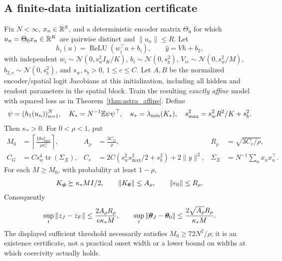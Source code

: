 \subsection{A finite-data initialization certificate}
\begin{corollary}
\label{cor:astra_init}
Fix $N<\infty$, $x_n\in\mathbb{R}^S$, and a deterministic encoder matrix
$\Theta_0$ for which $u_n=\Theta_0x_n\in\mathbb{R}^K$ are pairwise distinct
and $\|u_n\|\le R$. Let
\[
 h_i(u)=\operatorname{ReLU}(w_i^\top u+b_i),\qquad \hat y=Vh+b_2,
\]
with independent $w_i\sim\mathcal N(0,s_w^2I_K/K)$,
$b_i\sim\mathcal N(0,s_b^2)$, $V_{ci}\sim\mathcal N(0,s_w^2/M)$,
$b_{2,c}\sim\mathcal N(0,s_b^2)$, and $s_w,s_b>0$, $1\le c\le C$.
Let $A,B$ be the normalized encoder/spatial logit Jacobians at this
initialization, including all hidden and readout parameters in the
spatial block. Train the resulting \emph{exactly affine} model with
squared loss as in Theorem~\ref{thm:astra_affine}.
Define
\[
 \psi=(h_1(u_n))_{n=1}^N,\quad K_*=N^{-1}\mathbb{E}\psi\psi^\top,
 \quad\kappa_*=\lambda_{\min}(K_*),\quad
 s_{\max}^2=s_w^2R^2/K+s_b^2.
\]
Then $\kappa_*>0$. For $0<\rho<1$, put
\begin{align*}
 M_0&=\left\lceil\frac{18s_{\max}^4}{\rho\kappa_*^2}\right\rceil,
 & A_\rho&=\frac{3C_G}{\rho},
 & R_\rho&=\sqrt{3C_r/\rho},\\
 C_G&=Cs_w^4\operatorname{tr}(\Sigma_X),
 & C_r&=2C(s_w^2s_{\max}^2/2+s_b^2)+2\|y\|^2,
 &\Sigma_X&=N^{-1}\sum_nx_nx_n^\top.
\end{align*}
For each $M\ge M_0$, with probability at least $1-\rho$,
\[
 K_{\boldsymbol{\phi}}\succeq\kappa_*M I/2,\qquad \|K_{\boldsymbol{\theta}}\|\le A_\rho,
 \qquad\|e_0\|\le R_\rho.
\]
Consequently
\[
 \sup_t\|z_J-z_F\|\le\frac{2A_\rho R_\rho}{e\kappa_*M},
 \qquad\sup_t\|{\boldsymbol{\theta}}_J-{\boldsymbol{\theta}}_0\|
 \le\frac{2\sqrt{A_\rho}R_\rho}{\kappa_*M}.
\]
The displayed sufficient threshold necessarily satisfies
$M_0\ge72N^2/\rho$; it is an existence certificate, not a practical
onset width or a lower bound on widths at which coercivity actually holds.
\end{corollary}
